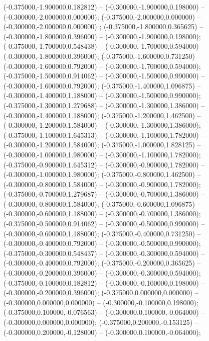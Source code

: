  (-0.375000,-1.900000,0.182812) -- (-0.300000,-1.900000,0.198000) -- (-0.300000,-2.000000,0.000000);
 (-0.375000,-2.000000,0.000000) -- (-0.300000,-2.000000,0.000000) ;
 (-0.375000,-1.800000,0.365625) -- (-0.300000,-1.800000,0.396000) -- (-0.300000,-1.900000,0.198000);
 (-0.375000,-1.700000,0.548438) -- (-0.300000,-1.700000,0.594000) -- (-0.300000,-1.800000,0.396000);
 (-0.375000,-1.600000,0.731250) -- (-0.300000,-1.600000,0.792000) -- (-0.300000,-1.700000,0.594000);
 (-0.375000,-1.500000,0.914062) -- (-0.300000,-1.500000,0.990000) -- (-0.300000,-1.600000,0.792000);
 (-0.375000,-1.400000,1.096875) -- (-0.300000,-1.400000,1.188000) -- (-0.300000,-1.500000,0.990000);
 (-0.375000,-1.300000,1.279688) -- (-0.300000,-1.300000,1.386000) -- (-0.300000,-1.400000,1.188000);
 (-0.375000,-1.200000,1.462500) -- (-0.300000,-1.200000,1.584000) -- (-0.300000,-1.300000,1.386000);
 (-0.375000,-1.100000,1.645313) -- (-0.300000,-1.100000,1.782000) -- (-0.300000,-1.200000,1.584000);
 (-0.375000,-1.000000,1.828125) -- (-0.300000,-1.000000,1.980000) -- (-0.300000,-1.100000,1.782000);
 (-0.375000,-0.900000,1.645312) -- (-0.300000,-0.900000,1.782000) -- (-0.300000,-1.000000,1.980000);
 (-0.375000,-0.800000,1.462500) -- (-0.300000,-0.800000,1.584000) -- (-0.300000,-0.900000,1.782000);
 (-0.375000,-0.700000,1.279687) -- (-0.300000,-0.700000,1.386000) -- (-0.300000,-0.800000,1.584000);
 (-0.375000,-0.600000,1.096875) -- (-0.300000,-0.600000,1.188000) -- (-0.300000,-0.700000,1.386000);
 (-0.375000,-0.500000,0.914062) -- (-0.300000,-0.500000,0.990000) -- (-0.300000,-0.600000,1.188000);
 (-0.375000,-0.400000,0.731250) -- (-0.300000,-0.400000,0.792000) -- (-0.300000,-0.500000,0.990000);
 (-0.375000,-0.300000,0.548437) -- (-0.300000,-0.300000,0.594000) -- (-0.300000,-0.400000,0.792000);
 (-0.375000,-0.200000,0.365625) -- (-0.300000,-0.200000,0.396000) -- (-0.300000,-0.300000,0.594000);
 (-0.375000,-0.100000,0.182812) -- (-0.300000,-0.100000,0.198000) -- (-0.300000,-0.200000,0.396000);
 (-0.375000,0.000000,0.000000) -- (-0.300000,0.000000,0.000000) -- (-0.300000,-0.100000,0.198000);
 (-0.375000,0.100000,-0.076563) -- (-0.300000,0.100000,-0.064000) -- (-0.300000,0.000000,0.000000);
 (-0.375000,0.200000,-0.153125) -- (-0.300000,0.200000,-0.128000) -- (-0.300000,0.100000,-0.064000);
